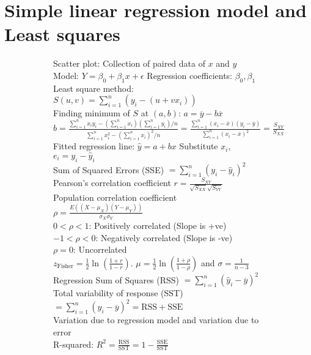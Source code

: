 \documentclass{article}
\begin{document}
\section{Simple linear regression model and Least squares}
\begin{figure}[h!]
    \begin{subfigure}[h!]{0.5\textwidth}
        Scatter plot: Collection of paired data of $x$ and $y$\\
        Model: $Y=\beta_{0}+\beta_{1}x+\epsilon$ \quad Regression coefficients: $\beta_{0},\beta_{1}$\\
        Least square method: $S(u,v)=\sum_{i=1}^{n}(y_{i}-(u+vx_{i}))$\\
        Finding minimum of $S$ at $(a,b)$: $a=\overline{y}-b\overline{x}$\\
        $b=\frac{\sum_{i=1}^{n}x_{i}y_{i}-(\sum_{i=1}^{n}x_{i})(\sum_{i=1}^{n}y_{i})/n}{\sum_{i=1}^{n}x_{i}^{2}-(\sum_{i=1}^{n}x_{i})^{2}/n}=\frac{\sum_{i=1}^{n}(x_{i}-\overline{x})(y_{i}-\overline{y})}{\sum_{i=1}^{n}(x_{i}-\overline{x})^{2}}=\frac{S_{XY}}{S_{XX}}$\\
        Fitted regression line: $\hat{y}=a+bx$ \quad Substitute $x_{i}$, $e_{i}=y_{i}-\hat{y}_{i}$\\
        Sum of Squared Errors (SSE) $=\sum_{i=1}^{n}(y_{i}-\hat{y}_{i})^{2}$\\
        Pearson's correlation coefficient $r=\frac{S_{XY}}{\sqrt{S_{XX}}\sqrt{S_{YY}}}$\\
        Population correlation coefficient $\rho=\frac{E((X-\mu_{X})(Y-\mu_{Y}))}{\sigma_{X}\sigma_{Y}}$\\
        $0<\rho<1$: Positively correlated (Slope is +ve)\\
        $-1<\rho<0$: Negatively correlated (Slope is -ve)\\
        $\rho=0$: Uncorrelated\\
        $z_{\text{Fisher}}=\frac{1}{2}\ln\left(\frac{1+r}{1-r}\right)$. $\mu=\frac{1}{2}\ln\left(\frac{1+\rho}{1-\rho}\right)$ and $\sigma=\frac{1}{n-3}$\\
        Regression Sum of Squares (RSS) $=\sum_{i=1}^{n}(\hat{y}_{i}-\overline{y})^{2}$\\
        Total variability of response (SST) $=\sum_{i=1}^{n}(y_{i}-\overline{y})^{2}=\text{RSS}+\text{SSE}$\\
        Variation due to regression model and variation due to error\\
        R-squared: $R^{2}=\frac{\text{RSS}}{\text{SST}}=1-\frac{\text{SSE}}{\text{SST}}$\\

\end{subfigure}
\end{figure}
\end{document}
